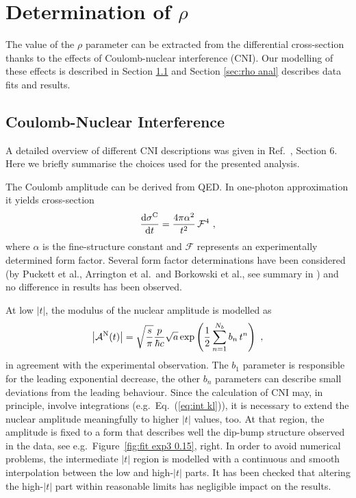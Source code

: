 \newpage

\section{Determination of $\rho$}
\label{sec:rho}

The value of the $\rho$ parameter can be extracted from the differential cross-section thanks to the effects of Coulomb-nuclear interference (CNI). Our modelling of these effects is described in Section \ref{sec:rho cni} and Section \ref{sec:rho anal} describes data fits and results.

\subsection{Coulomb-Nuclear Interference}
\label{sec:rho cni}

A detailed overview of different CNI descriptions was given in Ref.~\cite{totem-8tev-1km}, Section 6. Here we briefly summarise the choices used for the presented analysis.

The Coulomb amplitude can be derived from QED. In one-photon approximation it yields cross-section
\begin{equation}
\label{eq:coul cs}
	{{\rm d}\sigma^{\rm C}\over {\rm d}t} = {4\pi\alpha^2\over t^2}\,{\mathcal{F}}^4\ ,
\end{equation}
where $\alpha$ is the fine-structure constant and $\mathcal{F}$ represents an experimentally determined form factor. Several form factor determinations have been considered (by Puckett et al., Arrington et al.~and Borkowski et al., see summary in \cite{elegent}) and no difference in results has been observed.

At low $|t|$, the modulus of the nuclear amplitude is modelled as
\begin{equation}
\label{eq:nuc mod}
\left | {\cal A}^{\rm N}(t) \right | = \sqrt{s\over\pi} {p\over \hbar c} \sqrt{a} \exp\left( {1\over 2} \sum\limits_{n = 1}^{N_b} b_n\, t^n \right)\ ,
\end{equation}
in agreement with the experimental observation. The $b_1$ parameter is responsible for the leading exponential decrease, the other $b_n$ parameters can describe small deviations from the leading behaviour. Since the calculation of CNI may, in principle, involve integrations (e.g.~Eq.~(\ref{eq:int kl})), it is necessary to extend the nuclear amplitude meaningfully to higher $|t|$ values, too. At that region, the amplitude is fixed to a form that describes well the dip-bump structure observed in the data, see e.g.~Figure~\ref{fig:fit exp3 0.15}, right. In order to avoid numerical problems, the intermediate $|t|$ region is modelled with a continuous and smooth interpolation between the low and high-$|t|$ parts. It has been checked that altering the high-$|t|$ part within reasonable limits has negligible impact on the results.


